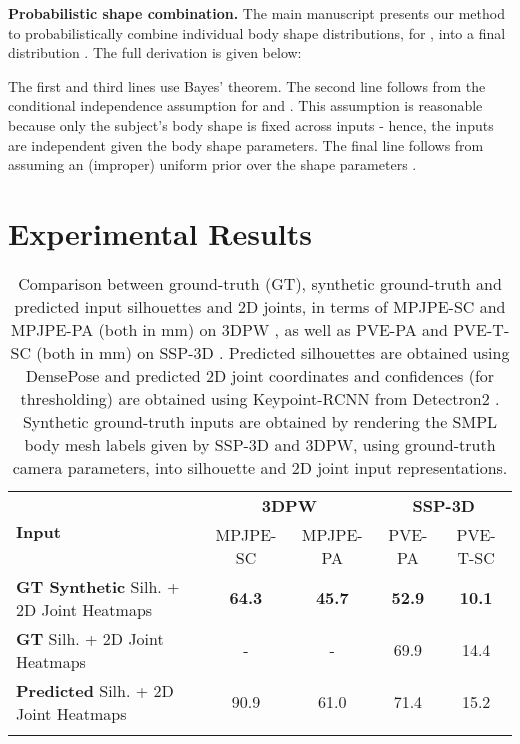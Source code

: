 \documentclass[final]{cvpr}
\begin{document}
\noindent \textbf{Probabilistic shape combination.} The main manuscript presents our method to probabilistically combine individual body shape distributions,  for , into a final distribution . The full derivation is given below:

The first and third lines use Bayes' theorem. The second line follows from the conditional independence assumption  for  and . This assumption is reasonable because only the subject's body shape is fixed across inputs - hence, the inputs are independent given the body shape parameters. The final line follows from assuming an (improper) uniform prior over the shape parameters .


\section{Experimental Results}
\label{sec:supmat_experiment_results}

\begin{table*}[!b]
\centering
    \begin{tabular}{l cc cc}
    \hline
    \multirow{2}{3em}{\textbf{Input}} & \multicolumn{2}{c}{\textbf{3DPW}} & \multicolumn{2}{c}{\textbf{SSP-3D}}\\
    & MPJPE-SC & MPJPE-PA & PVE-PA & PVE-T-SC\\
    \noalign{\smallskip}
    \hline
    \noalign{\smallskip}
    \textbf{GT Synthetic} Silh. + 2D Joint Heatmaps & \textbf{64.3} & \textbf{45.7} & \textbf{52.9} & \textbf{10.1}\\
    \noalign{\smallskip}
    \textbf{GT} Silh. + 2D Joint Heatmaps & - & - & 69.9 & 14.4\\
    \noalign{\smallskip}
    \textbf{Predicted} Silh. + 2D Joint Heatmaps & 90.9 & 61.0 & 71.4 & 15.2\\
    \noalign{\smallskip}
    \hline
    \end{tabular}
\caption{Comparison between ground-truth (GT), synthetic ground-truth and predicted input silhouettes and 2D joints, in terms of MPJPE-SC and MPJPE-PA (both in mm) on 3DPW \cite{vonMarcard2018}, as well as PVE-PA and PVE-T-SC (both in mm) on SSP-3D \cite{STRAPS2020BMVC}. Predicted silhouettes are obtained using DensePose \cite{Guler2018DensePose} and predicted 2D joint coordinates and confidences (for thresholding) are obtained using Keypoint-RCNN from Detectron2 \cite{wu2019detectron2}. Synthetic ground-truth inputs are obtained by rendering the SMPL \cite{SMPL:2015} body mesh labels given by SSP-3D and 3DPW, using ground-truth camera parameters, into silhouette and 2D joint input representations.}
\label{table:supmat_gt_vs_pred_inputs}
\end{table*}
\end{document}
